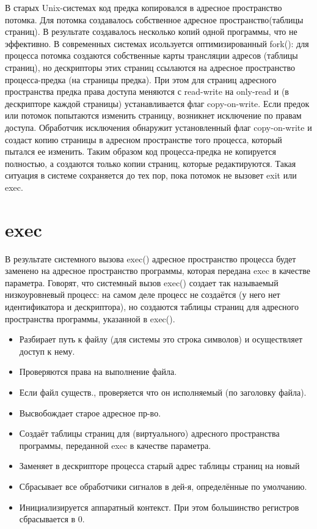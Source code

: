 В старых Unix-системах код предка копировался в адресное пространство потомка. Для потомка создавалось собственное адресное пространство(таблицы страниц). В результате создавалось несколько копий одной программы, что не эффективно. В современных системах исользуется оптимизированный fork(): для процесса потомка создаются собственные карты трансляции адресов (таблицы страниц), но дескрипторы этих страниц ссылаются на адресное пространство процесса-предка (на страницы предка). При этом для страниц адресного пространства предка права доступа меняются с read-write на only-read и (в дескрипторе каждой страницы) устанавливается флаг copy-on-write. Если предок или потомок попытаются изменить страницу, возникнет исключение по правам доступа. Обработчик исключения обнаружит установленный флаг copy-on-write и создаст копию страницы в адресном пространстве того процесса, который пытался ее изменить. Таким образом код процесса-предка не копируется полностью, а создаются только копии страниц, которые редактируются.
Такая ситуация в системе сохраняется до тех пор, пока потомок не вызовет exit или exec.

\section{exec}
В результате системного вызова exec() адресное пространство процесса будет заменено на адресное пространство программы, которая передана exec в качестве параметра. Говорят, что системный вызов exec() создает так называемый низкоуровневый процесс: на самом деле процесс не создаётся (у него нет идентификатора и дескриптора), но создаются таблицы страниц для адресного пространства программы, указанной в exec().

\begin{itemize}
	\item Разбирает путь к файлу (для системы это строка символов) и осуществляет доступ к нему.
	\item Проверяются права на выполнение файла.
	\item Если файл существ., проверяется что он исполняемый (по заголовку файла).
	\item Высвобождает старое адресное пр-во.
	\item Создаёт таблицы страниц для (виртуального) адресного пространства программы, переданной exec в качестве параметра.
	\item Заменяет в дескрипторе процесса старый адрес таблицы страниц на новый
	\item Сбрасывает все обработчики сигналов в дей-я, определённые по умолчанию.
	\item Инициализируется аппаратный контекст. При этом большинство регистров сбрасывается в 0.
\end{itemize}

